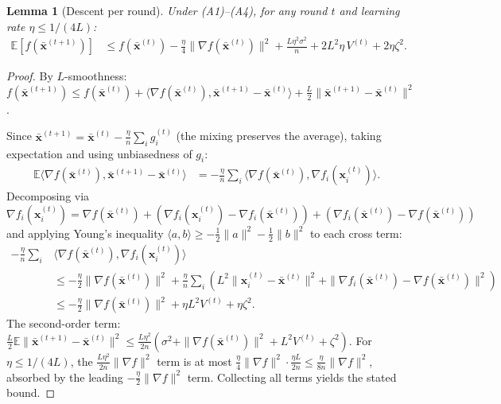 \documentclass{article}
\newtheorem{lemma}[theorem]{Lemma}
\newcommand{\E}{\mathbb{E}}
\newcommand{\bx}{\mathbf{x}}
\begin{document}
\begin{lemma}[Descent per round]
\label{lem:descent}
Under (A1)--(A4), for any round $t$ and learning rate $\eta \le 1/(4L)$:
\begin{align*}
\E[f(\bar{\bx}^{(t+1)})]
&\le f(\bar{\bx}^{(t)}) - \frac{\eta}{4}\|\nabla f(\bar{\bx}^{(t)})\|^2
+ \frac{L\eta^2\sigma^2}{n} + 2L^2\eta\, V^{(t)} + 2\eta\zeta^2.
\end{align*}
\end{lemma}
\begin{proof}
By $L$-smoothness:
$f(\bar{\bx}^{(t+1)}) \le f(\bar{\bx}^{(t)})
+ \langle\nabla f(\bar{\bx}^{(t)}), \bar{\bx}^{(t+1)} - \bar{\bx}^{(t)}\rangle
+ \frac{L}{2}\|\bar{\bx}^{(t+1)} - \bar{\bx}^{(t)}\|^2$.

Since $\bar{\bx}^{(t+1)} = \bar{\bx}^{(t)} - \frac{\eta}{n}\sum_i g_i^{(t)}$
(the mixing preserves the average), taking expectation and using
unbiasedness of $g_i$:
\begin{align*}
\E\langle\nabla f(\bar{\bx}^{(t)}), \bar{\bx}^{(t+1)}-\bar{\bx}^{(t)}\rangle
&= -\frac{\eta}{n}\sum_i \langle\nabla f(\bar{\bx}^{(t)}), \nabla f_i(\bx_i^{(t)})\rangle.
\end{align*}
Decomposing via $\nabla f_i(\bx_i^{(t)}) = \nabla f(\bar{\bx}^{(t)})
+ (\nabla f_i(\bx_i^{(t)}) - \nabla f_i(\bar{\bx}^{(t)}))
+ (\nabla f_i(\bar{\bx}^{(t)}) - \nabla f(\bar{\bx}^{(t)}))$
and applying Young's inequality
$\langle a, b\rangle \ge -\frac{1}{2}\|a\|^2 - \frac{1}{2}\|b\|^2$
to each cross term:
\begin{align*}
-\frac{\eta}{n}\sum_i &\langle \nabla f(\bar{\bx}^{(t)}), \nabla f_i(\bx_i^{(t)})\rangle \\
&\le -\frac{\eta}{2}\|\nabla f(\bar{\bx}^{(t)})\|^2
+ \frac{\eta}{n}\sum_i \left(L^2\|\bx_i^{(t)} - \bar{\bx}^{(t)}\|^2
+ \|\nabla f_i(\bar{\bx}^{(t)}) - \nabla f(\bar{\bx}^{(t)})\|^2\right) \\
&\le -\frac{\eta}{2}\|\nabla f(\bar{\bx}^{(t)})\|^2
+ \eta L^2 V^{(t)} + \eta\zeta^2.
\end{align*}
The second-order term: $\frac{L}{2}\E\|\bar{\bx}^{(t+1)}-\bar{\bx}^{(t)}\|^2
\le \frac{L\eta^2}{2n}(\sigma^2 + \|\nabla f(\bar{\bx}^{(t)})\|^2
+ L^2 V^{(t)} + \zeta^2)$.
For $\eta \le 1/(4L)$, the $\frac{L\eta^2}{2n}\|\nabla f\|^2$ term
is at most $\frac{\eta}{4}\|\nabla f\|^2 \cdot \frac{\eta L}{2n}
\le \frac{\eta}{8n}\|\nabla f\|^2$, absorbed by the leading
$-\frac{\eta}{2}\|\nabla f\|^2$ term.  Collecting all terms yields
the stated bound.
\end{proof}
\end{document}
